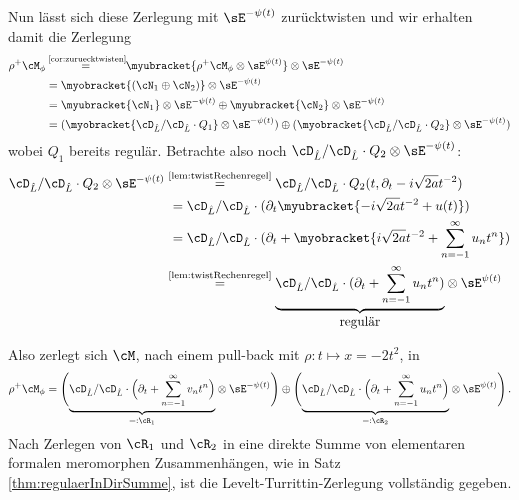 Nun lässt sich diese Zerlegung mit $\sE^{-\psi(t)}$ zurücktwisten und wir
erhalten damit die Zerlegung
\begin{align*}
\rho^+\cM_{\phi} &\!\!\overset{\text{ \ref{cor:zuruecktwisten}}}{=}\!\!
  \myubracket{\rho^+\cM_{\phi}\otimes\sE^{\psi(t)}} \otimes\sE^{-\psi(t)}
\\&= \myobracket{(\cN_1\oplus\cN_2)}\otimes\sE^{-\psi(t)}
\\&= \myubracket{\cN_1}\otimes\sE^{-\psi(t)}
  \oplus\myubracket{\cN_2}\otimes\sE^{-\psi(t)}
\\&= (\myobracket{\cD_{\hat L}/\cD_{\hat L}\cdot Q_1}\otimes\sE^{-\psi(t)})
  \oplus(\myobracket{\cD_{\hat L}/\cD_{\hat L}\cdot Q_2}\otimes\sE^{-\psi(t)})
\end{align*}
wobei $Q_1$ bereits regulär. Betrachte also noch $\cD_{\hat L}/\cD_{\hat
L}\cdot Q_2\otimes\sE^{-\psi(t)}$:
\begin{align*}
\cD_{\hat L}/\cD_{\hat L}\cdot Q_2\otimes\sE^{-\psi(t)}
  ~&\!\!\overset{\text{\ref{lem:twistRechenregel}}}{=}
  \cD_{\hat L}/\cD_{\hat L}\cdot Q_2(t,\partial_t-i\sqrt{2a}t^{-2})
\\&= \cD_{\hat L}/\cD_{\hat L}\cdot (\partial_t
  \myubracket{-i\sqrt{2a}t^{-2} + u(t)})
\\&= \cD_{\hat L}/\cD_{\hat L}\cdot (\partial_t + \myobracket{i\sqrt{2a}t^{-2}
  +\sum_{n=-1}^\infty u_nt^n})
\\&\!\!\overset{\text{\ref{lem:twistRechenregel}}}{=} \underset{\mbox{regulär}}{\underbrace{
  \cD_{\hat L}/\cD_{\hat L}\cdot (\partial_t
  + \sum_{n=-1}^\infty u_nt^n)}}\otimes\sE^{\psi(t)}
\end{align*}
\begin{comment}
Damit ist der zweite Summand also auch ein elementarer meromorpher
Zusammenhang.
\end{comment}
Also zerlegt sich $\cM$, nach einem pull-back mit $\rho:t\mapsto x=-2t^2$, in
\[
\rho^+\cM_{\phi} = \Bigg(
  \underset{=:\cR_1}{\underbrace{\cD_{\hat L}/\cD_{\hat L}\cdot \Big(\partial_t
  + \sum_{n=-1}^\infty v_nt^n\Big)}}\otimes\sE^{-\psi(t)}\Bigg)
  \oplus \Bigg(
  \underset{=:\cR_2}{\underbrace{\cD_{\hat L}/\cD_{\hat L}\cdot \Big(\partial_t
  + \sum_{n=-1}^\infty u_nt^n\Big)}}\otimes\sE^{\psi(t)}\Bigg) \,.
\]
Nach Zerlegen von $\cR_1$ und $\cR_2$ in eine direkte Summe von elementaren
formalen meromorphen Zusammenhängen, wie in Satz \ref{thm:regulaerInDirSumme},
ist die Levelt-Turrittin-Zerlegung vollständig gegeben.

